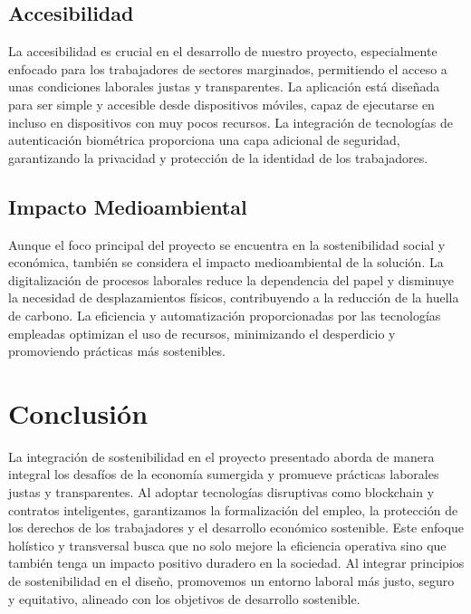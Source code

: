 \subsection{Accesibilidad}

La accesibilidad es crucial en el desarrollo de nuestro proyecto, especialmente enfocado para los trabajadores de sectores marginados, permitiendo el acceso a unas condiciones laborales justas y transparentes.
La aplicación está diseñada para ser simple y accesible desde dispositivos móviles, capaz de ejecutarse en
incluso en dispositivos con muy pocos recursos.
La integración de tecnologías de autenticación biométrica proporciona una capa adicional de seguridad, garantizando la privacidad y protección de la identidad de los trabajadores. 


\subsection{Impacto Medioambiental}

Aunque el foco principal del proyecto se encuentra en la sostenibilidad social y económica, también se considera el impacto medioambiental de la solución. 
La digitalización de procesos laborales reduce la dependencia del papel y disminuye la necesidad de
desplazamientos físicos, contribuyendo a la reducción de la huella de carbono. La eficiencia y automatización proporcionadas por las tecnologías empleadas optimizan el uso de recursos, minimizando el desperdicio y promoviendo prácticas más sostenibles.

\section{Conclusión}

La integración de sostenibilidad en el proyecto presentado aborda de manera integral los desafíos de la economía sumergida y promueve prácticas laborales justas y transparentes. Al adoptar tecnologías disruptivas como blockchain y contratos inteligentes, garantizamos la formalización del empleo, la protección de los derechos de los trabajadores y el desarrollo económico sostenible. 
Este enfoque holístico y transversal busca que no solo mejore la eficiencia operativa sino que también tenga un impacto positivo duradero en la sociedad. Al integrar principios de sostenibilidad en el diseño, promovemos un entorno laboral más justo, seguro y equitativo, alineado con los objetivos de desarrollo sostenible.